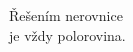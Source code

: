 \documentclass[preview]{standalone}
\begin{document}
\begin{center}
Řešením nerovnice\\ je vždy polorovina.
\end{center}
\end{document}
